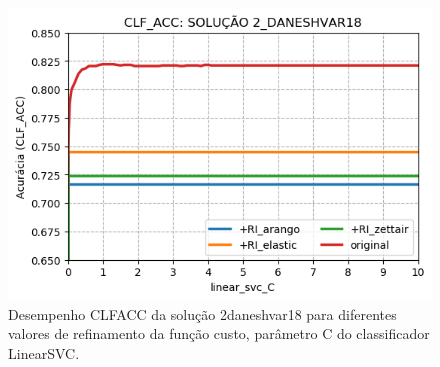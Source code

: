 \begin{figure}[ht]
    \centering
    \caption{Desempenho CLF\underscore{}ACC da solução 2\underscore{}daneshvar18 para diferentes valores de refinamento da função custo, parâmetro C do classificador LinearSVC.}
    \vspace{-0.5cm}
    \begin{center}
        \includegraphics[scale=0.75]{img/clf-acc-2-daneshvar18.png}
    \end{center}
    \vspace{-0.5cm}
    \label{fig:clf-acc-2-daneshvar18}
\end{figure}